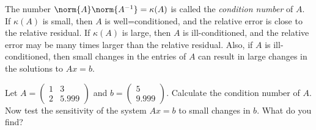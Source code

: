 The number $\norm{A} \norm{A^{-1}} = \kappa (A)$ is called the \emph{condition number} of $A$. If $\kappa (A)$ is small, then $A$ is well=conditioned, and the relative error is close to the relative residual. If $\kappa (A)$ is large, then $A$ is ill-conditioned, and the relative error may be many times larger than the relative residual. Also, if $A$ is ill-conditioned, then small changes in the entries of $A$ can result in large changes in the solutions to $Ax = b$. 

\begin{problem}
Let $A =\begin{pmatrix}1 & 3\\2 & 5.999\end{pmatrix}$ and $b = \begin{pmatrix}5\\9.999\end{pmatrix}$. Calculate the condition number of $A$. Now test the sensitivity of the system $Ax = b$ to small changes in $b$. What do you find?
\end{problem}
